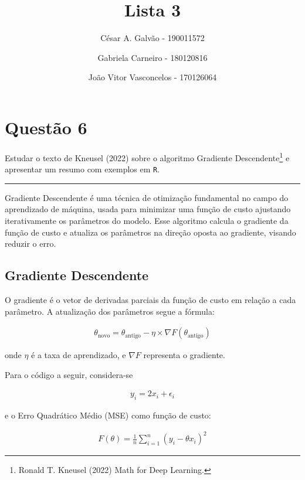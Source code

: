 \documentclass[
  a4paperpaper,
]{article}
\title{Lista 3}
\author{César A. Galvão - 190011572 \and Gabriela Carneiro -
180120816 \and João Vitor Vasconcelos - 170126064}
\date{}
\renewcommand*\contentsname{Índice}
\newcommand\contentsname{Índice}
\begin{document}
\maketitle

\renewcommand*\contentsname{Índice}
{
\hypersetup{linkcolor=}
\setcounter{tocdepth}{2}
\tableofcontents
}
\newpage{}

\section{Questão 6}\label{questuxe3o-6}

Estudar o texto de Kneusel (2022) sobre o algoritmo Gradiente
Descendente\footnote{Ronald T. Kneusel (2022) Math for Deep Learning.} e
apresentar um resumo com exemplos em \texttt{R}.

\begin{center}\rule{0.5\linewidth}{0.5pt}\end{center}

Gradiente Descendente é uma técnica de otimização fundamental no campo
do aprendizado de máquina, usada para minimizar uma função de custo
ajustando iterativamente os parâmetros do modelo. Esse algoritmo calcula
o gradiente da função de custo e atualiza os parâmetros na direção
oposta ao gradiente, visando reduzir o erro.

\subsection{Gradiente Descendente}\label{gradiente-descendente}

O gradiente é o vetor de derivadas parciais da função de custo em
relação a cada parâmetro. A atualização dos parâmetros segue a fórmula:

\begin{align}
  \theta_{\text{novo}} = \theta_{\text{antigo}} - \eta \times \nabla F(\theta_{\text{antigo}})
\end{align}

onde \(\eta\) é a taxa de aprendizado, e \(\nabla F\) representa o
gradiente.

Para o código a seguir, considera-se

\begin{align}
  y_i = 2 x_i + \epsilon_i
\end{align}

\noindent e o Erro Quadrático Médio (MSE) como função de custo:

\begin{align}
  F(\theta) = \frac{1}{n} \sum\limits_{i=1}^{n} (y_i - \theta x_i)^2
\end{align}
\end{document}
